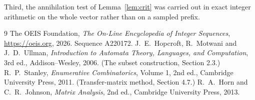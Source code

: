 \documentclass[11pt,a4paper]{article}
\theoremstyle{plain}
\theoremstyle{definition}
\begin{document}
Third, the annihilation test of Lemma~\ref{lem:crit} was carried out in exact integer
arithmetic on the whole vector rather than on a sampled prefix.

\begin{thebibliography}{9}
 The OEIS Foundation, \emph{The On-Line Encyclopedia of Integer
Sequences}, \url{https://oeis.org}, 2026. Sequence A220172.
 J.~E.~Hopcroft, R.~Motwani and J.~D.~Ullman, \emph{Introduction to Automata
Theory, Languages, and Computation}, 3rd ed., Addison--Wesley, 2006. (The subset
construction, Section 2.3.)
 R.~P.~Stanley, \emph{Enumerative Combinatorics}, Volume 1, 2nd ed.,
Cambridge University Press, 2011. (Transfer-matrix method, Section 4.7.)
 R.~A.~Horn and C.~R.~Johnson, \emph{Matrix Analysis}, 2nd ed., Cambridge
University Press, 2013.
\end{thebibliography}
\end{document}
